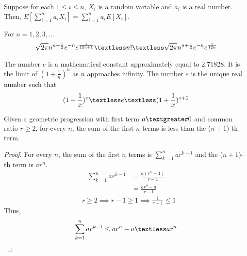 \begin{lemma}\label{linearity}
Suppose for each $1 \le i \le n$, $X_i$ is a random variable and $a_i$ is a real number. Then, $E[\sum_{i=1}^na_iX_i]=\sum_{i=1}^{n}a_iE[X_i]$.
\end{lemma}
\begin{lemma}\label{Stirling}
 For $n=1,2,3,...$
\begin{align}
    \nonumber \sqrt{2\pi}n^{n+\frac{1}{2}}e^{-n}e^{\frac{1}{12n+1}}\textless n! \textless \sqrt{2\pi}n^{n+\frac{1}{2}}e^{-n}e^{\frac{1}{12n}} 
\end{align}
\end{lemma}
\begin{definition}\label{e}
The number $e$ is a mathematical constant approximately equal to $2.71828$. It is the limit of $(1+\frac{1}{n})^n$ as $n$ approaches infinity. The number $e$ is the unique real number such that
\begin{align}
    \nonumber (1+\frac{1}{x})^{x} \textless e \textless (1+\frac{1}{x})^{x+1}
\end{align}
\end{definition}
\begin{lemma}\label{gp}
Given a geometric progression with first term $a \textgreater 0$ and common ratio $r \ge 2$, for every $n$, the sum of the first $n$ terms is less than the ($n+1$)-th term.
\end{lemma}
\begin{proof}
For every $n$, the sum of the first $n$ terms is $\sum_{k=1}^{n}ar^{k-1}$ and the ($n+1$)-th term is $ar^{n}$.
\begin{align}
    \nonumber \sum_{k=1}^{n}ar^{k-1}&=\frac{a(r^{n}-1)}{r-1}\\
    \nonumber &=\frac{ar^{n}-a}{r-1}
\end{align}
\begin{align}
    \nonumber &r\ge 2 \implies r-1 \ge 1 \implies \frac{1}{r-1} \le 1
\end{align}
Thus, 
\begin{align}
    \nonumber \sum_{k=1}^{n}ar^{k-1}\le ar^{n}-a \textless ar^{n}
\end{align} 
\end{proof}
